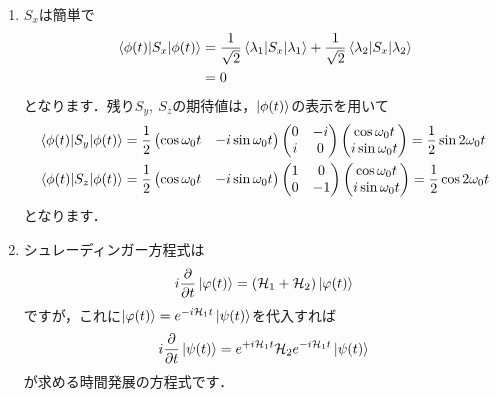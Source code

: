 \documentclass[a4paper,pdflatex,ja=standard]{bxjsarticle}
\begin{document}
\begin{enumerate}
  \item 

  $S_x$は簡単で
  \begin{align}
    \mel*{\phi(t)}{S_x}{\phi(t)}
    &=
    \frac{1}{\sqrt{2}}\mel*{\lambda_1}{S_x}{\lambda_1}
    +
    \frac{1}{\sqrt{2}}\mel*{\lambda_2}{S_x}{\lambda_2}
    \nonumber
    \\
    &=
    0
  \end{align}
  となります．残り$S_y,\ S_z$の期待値は，$\ket{\phi(t)}$の表示を用いて
  \begin{align}
    \mel*{\phi(t)}{S_y}{\phi(t)}    
    &=
    \frac{1}{2}
    \begin{pmatrix}
      \cos\omega_0t & -i\sin\omega_0t
    \end{pmatrix}
    \begin{pmatrix}
      0 & -i \\
      i & 0
    \end{pmatrix}
    \begin{pmatrix}
      \cos\omega_0t \\
      i\sin\omega_0t
    \end{pmatrix}
    =
    \frac{1}{2}\sin 2\omega_0t
    \\
    \mel*{\phi(t)}{S_z}{\phi(t)}    
    &=
    \frac{1}{2}
    \begin{pmatrix}
      \cos\omega_0t & -i\sin\omega_0t
    \end{pmatrix}
    \begin{pmatrix}
      1 & 0 \\
      0 & -1
    \end{pmatrix}
    \begin{pmatrix}
      \cos\omega_0t \\
      i\sin\omega_0t
    \end{pmatrix}
    =
    \frac{1}{2}\cos 2\omega_0t
  \end{align}
  となります．


  \item 

  シュレーディンガー方程式は
  \begin{equation}
    i
    \pdv{}{t}
    \ket{\varphi(t)}
    =
    (\mathcal{H}_1+\mathcal{H}_2)
    \ket{\varphi(t)}
  \end{equation}
  ですが，これに$\ket{\varphi(t)}=e^{-i\mathcal{H}_1t}\ket{\psi(t)}$を代入すれば
  \begin{equation}
    i\pdv{}{t}\ket{\psi(t)}
    =
    e^{+i\mathcal{H}_1t}
    \mathcal{H}_2
    e^{-i\mathcal{H}_1t}
    \ket{\psi(t)}
  \end{equation}
  が求める時間発展の方程式です．



\end{enumerate}
\end{document}
